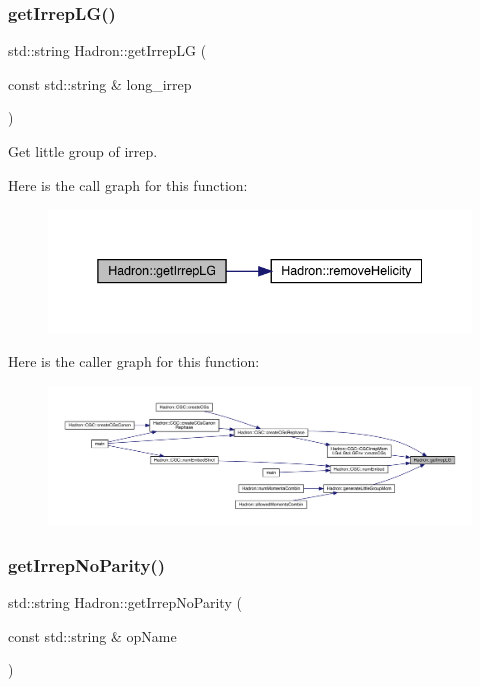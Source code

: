 \subsubsection{\texorpdfstring{getIrrepLG()}{getIrrepLG()}}
{\footnotesize\ttfamily std\+::string Hadron\+::get\+Irrep\+LG (\begin{DoxyParamCaption}\item[{const std\+::string \&}]{long\+\_\+irrep }\end{DoxyParamCaption})}



Get little group of irrep. 

Here is the call graph for this function\+:
\nopagebreak
\begin{figure}[H]
\begin{center}
\leavevmode
\includegraphics[width=338pt]{d1/daf/namespaceHadron_a79373fb0ae210931217ae33dc98f5ee9_cgraph}
\end{center}
\end{figure}
Here is the caller graph for this function\+:
\nopagebreak
\begin{figure}[H]
\begin{center}
\leavevmode
\includegraphics[width=350pt]{d1/daf/namespaceHadron_a79373fb0ae210931217ae33dc98f5ee9_icgraph}
\end{center}
\end{figure}
\mbox{\label{namespaceHadron_ae2543483bce4c1e4b6c9ca56d01fe9ac}} 
\subsubsection{\texorpdfstring{getIrrepNoParity()}{getIrrepNoParity()}}
{\footnotesize\ttfamily std\+::string Hadron\+::get\+Irrep\+No\+Parity (\begin{DoxyParamCaption}\item[{const std\+::string \&}]{op\+Name }\end{DoxyParamCaption})}

